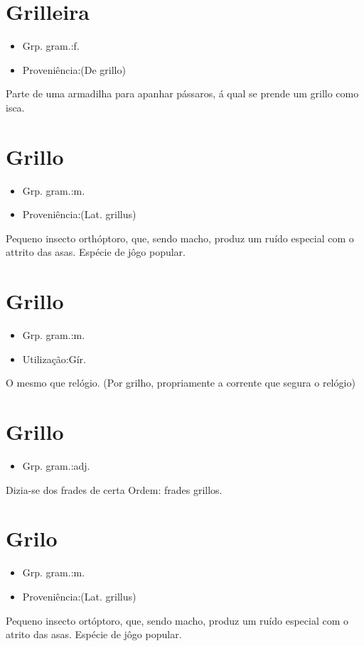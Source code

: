 \section{Grilleira}
\begin{itemize}
\item {Grp. gram.:f.}
\end{itemize}
\begin{itemize}
\item {Proveniência:(De \textunderscore grillo\textunderscore )}
\end{itemize}
Parte de uma armadilha para apanhar pássaros, á qual se prende um grillo como isca.
\section{Grillo}
\begin{itemize}
\item {Grp. gram.:m.}
\end{itemize}
\begin{itemize}
\item {Proveniência:(Lat. \textunderscore grillus\textunderscore )}
\end{itemize}
Pequeno insecto orthóptoro, que, sendo macho, produz um ruído especial com o attrito das asas.
Espécie de jôgo popular.
\section{Grillo}
\begin{itemize}
\item {Grp. gram.:m.}
\end{itemize}
\begin{itemize}
\item {Utilização:Gír.}
\end{itemize}
O mesmo que \textunderscore relógio\textunderscore .
(Por \textunderscore grilho\textunderscore , propriamente a corrente que segura o relógio)
\section{Grillo}
\begin{itemize}
\item {Grp. gram.:adj.}
\end{itemize}
Dizia-se dos frades de certa Ordem: \textunderscore frades grillos\textunderscore .
\section{Grilo}
\begin{itemize}
\item {Grp. gram.:m.}
\end{itemize}
\begin{itemize}
\item {Proveniência:(Lat. \textunderscore grillus\textunderscore )}
\end{itemize}
Pequeno insecto ortóptoro, que, sendo macho, produz um ruído especial com o atrito das asas.
Espécie de jôgo popular.
